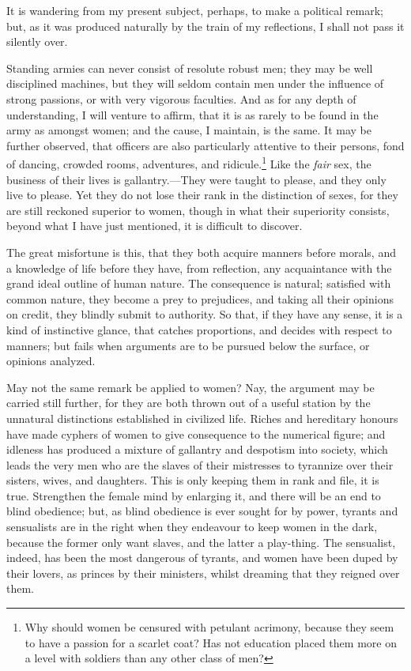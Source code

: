 It is wandering from my present subject,  perhaps, to make a
political remark; but, as it was produced naturally by the train of my
reflections, I shall not pass it silently over.

Standing armies can never consist of resolute robust men; they may be
well disciplined machines, but they will seldom contain men under the
influence of strong passions, or with very vigorous faculties. And as
for any depth of understanding, I will venture to affirm, that it is
as rarely to be found in the army as amongst women; and the cause, I
maintain, is the same. It may be further observed, that officers are
also particularly attentive to their persons, fond of dancing, crowded
rooms, adventures, and ridicule.\footnote{Why should women be censured
with petulant acrimony, because they seem to have a passion for a
scarlet coat? Has not education placed them more on a level with
soldiers than any other class of men?} Like the \textit{fair} sex, the
business of their lives is gallantry.---They were taught to please,
and they only live to please. Yet they do not lose their rank in the
distinction of sexes, for they are still reckoned superior to women,
though in what their superiority consists, beyond what I have just
mentioned, it is difficult to discover.

The great misfortune is this, that they  both acquire manners
before morals, and a knowledge of life before they have, from
reflection, any acquaintance with the grand ideal outline of human
nature. The consequence is natural; satisfied with common nature, they
become a prey to prejudices, and taking all their opinions on credit,
they blindly submit to authority. So that, if they have any sense, it
is a kind of instinctive glance, that catches proportions, and decides
with respect to manners; but fails when arguments are to be pursued
below the surface, or opinions analyzed.

May not the same remark be applied to women? Nay, the argument may be
carried still further, for they are both thrown out of a useful
station by the unnatural distinctions established in civilized life.
Riches and hereditary honours have made cyphers of women to give
consequence to the numerical figure; and idleness has produced a
mixture of gallantry and despotism into society, which leads the very
men who are the slaves of their mistresses to tyrannize over their
sisters, wives, and daughters. This is only keeping them in rank and
file, it is true. Strengthen the female mind by enlarging it, and
there will be an end to blind obedience; but, as blind obedience is
ever  sought for by power, tyrants and sensualists are in the
right when they endeavour to keep women in the dark, because the
former only want slaves, and the latter a play-thing. The sensualist,
indeed, has been the most dangerous of tyrants, and women have been
duped by their lovers, as princes by their ministers, whilst dreaming
that they reigned over them.


